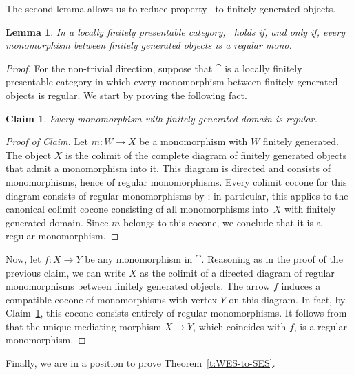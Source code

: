 \documentclass[a4paper,10pt,reqno]{amsart}
\newtheorem{lemma}[theorem]{Lemma}
\newtheorem{claim}[theorem]{Claim}
\theoremstyle{definition}
\theoremstyle{remark}
\begin{document}
The second lemma allows us to reduce property \SES~to finitely generated objects.
%
\begin{lemma}\label{l:SES-to-finitely-generated-objects}
	In a locally finitely presentable category, \SES~holds if, and only if, every monomorphism between finitely generated objects is a regular mono.
	\end{lemma}

	\begin{proof}
	For the non-trivial direction, suppose that $\cat$ is a locally finitely presentable category in which every monomorphism between finitely generated objects is regular. We start by proving the following fact.

	\begin{claim}\label{claim:fg-mono-reg}
	Every monomorphism with finitely generated domain is regular.
	\end{claim}
	\begin{proof}[Proof of Claim]
	Let $m\colon W\to X$ be a monomorphism with $W$ finitely generated. The object $X$ is the colimit of the complete diagram of finitely generated objects that admit a monomorphism into it. This diagram is directed and consists of monomorphisms, hence of regular monomorphisms. Every colimit cocone for this diagram consists of regular monomorphisms by \cite[Proposition~1.62(i)]{ar94book}; in particular, this applies to the canonical colimit cocone consisting of all monomorphisms into~$X$ with finitely generated domain. Since $m$ belongs to this cocone, we conclude that it is a regular monomorphism.
	\end{proof}
	
	Now, let $f\colon X\to Y$ be any monomorphism in $\cat$. Reasoning as in the proof of the previous claim, we can write $X$ as the colimit of a directed diagram of regular monomorphisms between finitely generated objects. The arrow $f$ induces a compatible cocone of monomorphisms with vertex $Y$ on this diagram. In fact, by Claim~\ref{claim:fg-mono-reg}, this cocone consists entirely of regular monomorphisms.  It follows from \cite[Proposition~1.62(ii)]{ar94book} that the unique mediating morphism $X\to Y$, which coincides with $f$, is a regular monomorphism.
	\end{proof}

Finally, we are in a position to prove Theorem~\ref{t:WES-to-SES}.
\end{document}
